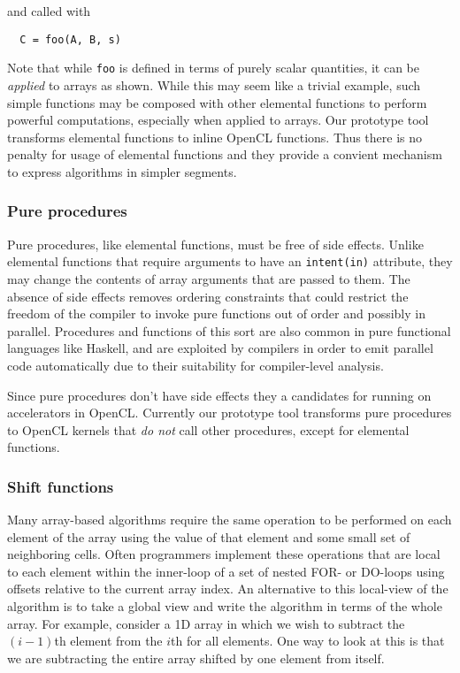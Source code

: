 \noindent and called with

{\small
\begin{verbatim}
  C = foo(A, B, s)
\end{verbatim}
}

Note that while {\tt foo} is defined in terms of purely scalar
quantities, it can be \emph{applied} to arrays as shown.  While this
may seem like a trivial example, such simple functions may be composed
with other elemental functions to perform powerful computations,
especially when applied to arrays.  Our prototype tool transforms
elemental functions to inline OpenCL functions.  Thus there is no
penalty for usage of elemental functions and they provide a convient
mechanism to express algorithms in simpler segments.


\subsubsection*{Pure procedures}

Pure procedures, like elemental functions, must be free of side
effects.  Unlike elemental functions that require arguments to have an
{\tt intent(in)} attribute, they may change the contents of array
arguments that are passed to them.  The absence of side effects
removes ordering constraints that could restrict the freedom of the
compiler to invoke pure functions out of order and possibly in parallel.
Procedures and functions of this sort are also common in pure
functional languages like Haskell, and are exploited by compilers in
order to emit parallel code automatically due to their suitability for
compiler-level analysis.

Since pure procedures don't have side effects they a candidates for
running on accelerators in OpenCL.  Currently our prototype tool
transforms pure procedures to OpenCL kernels that \emph{do not} call
other procedures, except for elemental functions.

\subsubsection*{Shift functions}

Many array-based algorithms require the same operation to be performed
on each element of the array using the value of that element and some small
set of neighboring cells.  Often programmers implement these operations that
are local to each element within the inner-loop of a set of nested FOR-
or DO-loops using offsets relative to the current array index.  An alternative
to this local-view of the algorithm is to take a global view and write the
algorithm in terms of the whole array.  For example, consider a 1D array in
which we wish to subtract the $(i-1)$th element from the $i$th for all
elements.  One way to look at this is that we are subtracting the entire array
shifted by one element from itself.

